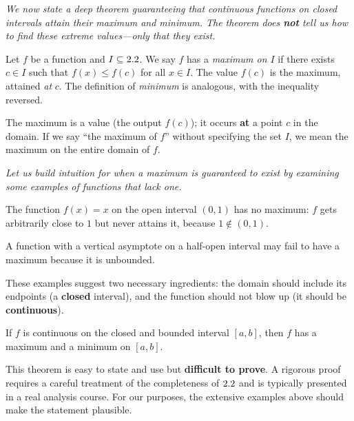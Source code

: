 \textit{We now state a deep theorem guaranteeing that continuous functions on closed intervals attain their maximum and minimum.  The theorem does \textbf{not} tell us how to find these extreme values---only that they exist.}

\begin{definition}
\label{def:2-10}
Let $f$ be a function and $I \subseteq 2.2$.  We say $f$ has a \emph{maximum on $I$} if there exists $c \in I$ such that $f(x) \leq f(c)$ for all $x \in I$.  The value $f(c)$ is the maximum, attained \emph{at} $c$.  The definition of \emph{minimum} is analogous, with the inequality reversed.
\end{definition}

\begin{remark}
The maximum is a value (the output $f(c)$); it occurs \textbf{at} a point $c$ in the domain.  If we say ``the maximum of $f$'' without specifying the set $I$, we mean the maximum on the entire domain of $f$.
\end{remark}

\textit{Let us build intuition for when a maximum is guaranteed to exist by examining some examples of functions that lack one.}

\begin{example}
\label{ex:2-21}
The function $f(x) = x$ on the open interval $(0, 1)$ has no maximum: $f$ gets arbitrarily close to $1$ but never attains it, because $1 \notin (0,1)$.
\end{example}

\begin{example}
\label{ex:2-22}
A function with a vertical asymptote on a half-open interval may fail to have a maximum because it is unbounded.
\end{example}

\begin{remark}
These examples suggest two necessary ingredients: the domain should include its endpoints (a \textbf{closed} interval), and the function should not blow up (it should be \textbf{continuous}).
\end{remark}

\begin{theorem}
\label{thm:2-15}
If $f$ is continuous on the closed and bounded interval $[a, b]$, then $f$ has a maximum and a minimum on $[a, b]$.
\end{theorem}

\begin{remark}
This theorem is easy to state and use but \textbf{difficult to prove}.  A rigorous proof requires a careful treatment of the completeness of $2.2$ and is typically presented in a real analysis course.  For our purposes, the extensive examples above should make the statement plausible.
\end{remark}

